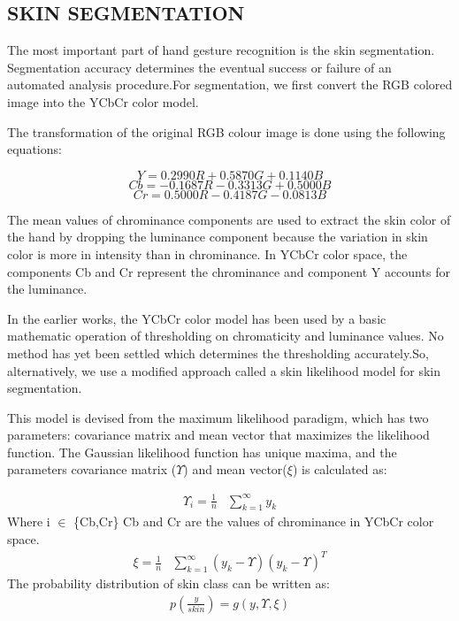 \documentclass[conference]{IEEEtran}
\begin{document}
\subsection{SKIN SEGMENTATION}

The most important part of hand gesture recognition is the skin segmentation. Segmentation accuracy determines the eventual success or failure of an automated analysis procedure.For segmentation, we first convert the RGB colored image into the YCbCr color model.

The transformation of the original RGB colour image is done using
the following equations:

\begin{equation}
 Y = 0.2990R + 0.5870G + 0.1140B
\end{equation}
\begin{equation}
 Cb = -0.1687R - 0.3313G + 0.5000B
\end{equation}
\begin{equation}
 Cr = 0.5000R - 0.4187G - 0.0813B
\end{equation}


The mean values of chrominance components are used to extract the skin color of the hand by dropping the luminance component because the variation in skin color is more in intensity than in chrominance. In YCbCr color space, the components Cb and Cr represent the chrominance and component Y accounts for the luminance.

In the earlier works, the YCbCr color model has been used by a basic mathematic operation of thresholding on chromaticity and luminance values. No method has yet been settled which determines the thresholding accurately.So, alternatively, we use a modified approach called a skin likelihood model for skin segmentation.

This model is devised from the maximum likelihood paradigm, which has two parameters: covariance matrix and mean vector that maximizes the likelihood function. The Gaussian likelihood function \cite{vishwakarma2015efficient} has unique maxima, and the parameters  covariance matrix ($\Upsilon$) and mean vector($\xi$) is calculated as:

\begin{equation}
\begin{aligned}
\Upsilon_i = \frac{1}{n} & \sum_{k=1}^\infty y_k
\end{aligned}
\end{equation}
Where i $\in$ \{Cb,Cr\}  Cb and Cr are the values of chrominance in YCbCr color space.
\begin{equation}
\begin{aligned}
\xi = \frac{1}{n} & \sum_{k=1}^\infty \left(y_k - \Upsilon \right)\left(y_k - \Upsilon \right)^T
\end{aligned}
\end{equation}
The probability distribution of skin class can be written as:
\begin{equation}
\begin{aligned}
p(\frac{y}{skin}) =  g(y,\Upsilon,\xi)
\end{aligned}
\end{equation}
\end{document}
